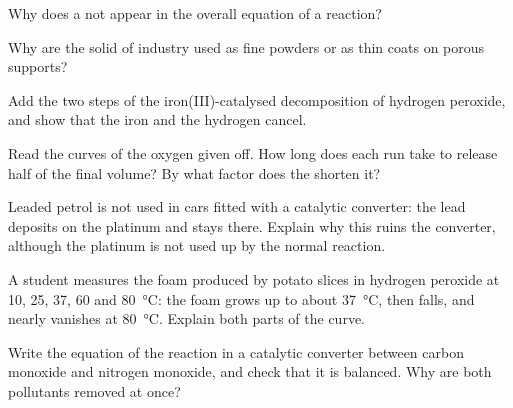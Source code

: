 \begin{exercise}[$\star$]\label{exo:g12:catalysis:4}
Why does a  not appear in the overall equation of a reaction?
\end{exercise}

\begin{exercise}[$\star$]\label{exo:g12:catalysis:5}
Why are the solid  of industry used as fine powders or as thin
coats on porous supports?
\end{exercise}

\begin{exercise}[$\star\star$]\label{exo:g12:catalysis:6}
Add the two steps of the iron(III)-catalysed decomposition of hydrogen
peroxide, and show that the iron  and the hydrogen  cancel.
\end{exercise}

\begin{exercise}[$\star\star$]\label{exo:g12:catalysis:7}
Read the curves of the oxygen given off. How long does each run take to
release half of the final volume? By what factor does the 
shorten it?
\end{exercise}

\begin{exercise}[$\star\star$]\label{exo:g12:catalysis:8}
Leaded petrol is not used in cars fitted with a catalytic converter: the
lead deposits on the platinum and stays there. Explain why this ruins the
converter, although the platinum is not used up by the normal reaction.
\end{exercise}

\begin{exercise}[$\star\star$]\label{exo:g12:catalysis:9}
A student measures the foam produced by potato slices in hydrogen
peroxide at 10, 25, 37, 60 and \qty{80}{\celsius}: the foam grows up to
about \qty{37}{\celsius}, then falls, and nearly vanishes at
\qty{80}{\celsius}. Explain both parts of the curve.
\end{exercise}

\begin{exercise}[$\star\star$]\label{exo:g12:catalysis:10}
Write the equation of the reaction in a catalytic converter between
carbon monoxide and nitrogen monoxide, and check that it is balanced.
Why are both pollutants removed at once?
\end{exercise}

